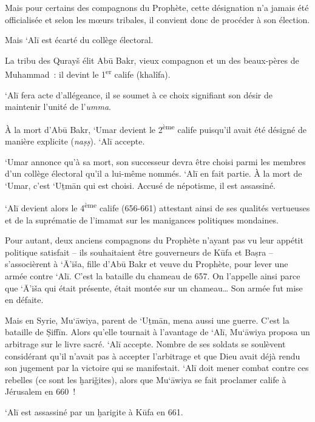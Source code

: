 Mais pour certains des compagnons du Prophète, cette désignation n'a
jamais été officialisée et selon les mœurs tribales, il convient donc de
procéder à son élection.

Mais `Alī est écarté du collège électoral.

La tribu des Qurayš élit Abū Bakr, vieux compagnon et un des beaux-pères
de Muhammad~: il devint le 1\textsuperscript{er} calife (khalîfa).

`Alī fera acte d'allégeance, il se soumet à ce choix signifiant son
désir de maintenir l'unité de l'\emph{umma}.

À la mort d'Abū Bakr, `Umar devient le 2\textsuperscript{ème} calife
puisqu'il avait été désigné de manière explicite (\emph{naṣṣ}). `Alī
accepte.

`Umar annonce qu'à sa mort, son successeur devra être choisi parmi les
membres d'un collège électoral qu'il a lui-même nommés. `Alī en fait
partie. À la mort de `Umar, c'est `Uṯmān qui est choisi. Accusé de
népotisme, il est assassiné.

`Alī devient alors le 4\textsuperscript{ème} calife (656-661) attestant
ainsi de ses qualités vertueuses et de la suprématie de l'imamat sur les
manigances politiques mondaines.

Pour autant, deux anciens compagnons du Prophète n'ayant pas vu leur
appétit politique satisfait -- ils souhaitaient être gouverneurs de Kūfa
et Baṣra -- s'associèrent à `Ā'iša, fille d'Abū Bakr et veuve du
Prophète, pour lever une armée contre `Alī. C'est la bataille du chameau
de 657. On l'appelle ainsi parce que `Ā'iša qui était présente, était
montée sur un chameau\ldots{} Son armée fut mise en défaite.








Mais en Syrie, Mu`āwiya, parent de `Uṯmān, mena aussi une guerre. C'est
la bataille de Ṣiffīn. Alors qu'elle tournait à l'avantage de `Alī,
Mu`āwiya proposa un arbitrage sur le livre sacré. `Alī accepte. Nombre
de ses soldats se soulèvent considérant qu'il n'avait pas à accepter
l'arbitrage et que Dieu avait déjà rendu son jugement par la victoire
qui se manifestait. `Alī doit mener combat contre ces rebelles (ce sont
les ḫariǧites), alors que Mu`āwiya se fait proclamer calife à Jérusalem
en 660~!

`Alī est assassiné par un ḫarigite à Kūfa en 661.

